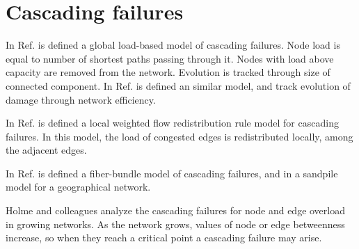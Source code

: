 \documentclass[12pt]{article}
\begin{document}
\section{Cascading failures}

In Ref. \cite{Motter2002} is defined a global load-based model of cascading failures. Node load is equal to number of shortest paths passing through it. Nodes with load above capacity are removed from the network. Evolution is tracked through size of connected component. In Ref. \cite{Crucitti2004} is defined an similar model, and track evolution of damage through network efficiency. \medskip

In Ref. \cite{Wang2008} is defined a local weighted flow redistribution rule model for cascading failures. In this model, the load of congested edges is redistributed locally, among the adjacent edges.\medskip

In Ref. \cite{Moreno2002} is defined a fiber-bundle model of cascading failures, and in \cite{Huang2006} a sandpile model for a geographical network.\medskip

Holme and colleagues analyze the cascading failures for node \cite{Holme2002b} and edge \cite{Holme2002c} overload in growing networks. As the network grows, values of node or edge betweenness increase, so when they reach a critical point a cascading failure may arise.\medskip

\medskip

\nocite{*}



\end{document}
